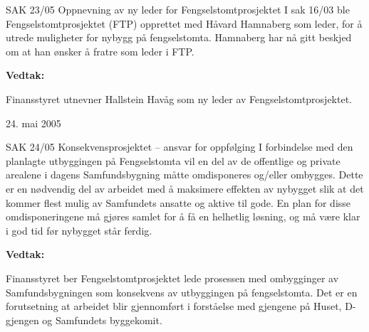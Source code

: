 \begin{instruksledd}{SAK 23/05 Oppnevning av ny leder for Fengselstomtprosjektet}
    I sak 16/03 ble Fengselstomtprosjektet (FTP) opprettet med Håvard Hamnaberg som leder,
    for å utrede muligheter for
    nybygg på fengselstomta. Hamnaberg har nå gitt beskjed om at han ønsker å fratre som
    leder i FTP.

    \textbf{Vedtak:}

    Finansstyret utnevner Hallstein Havåg som ny leder av Fengselstomtprosjektet.
    
    24. mai 2005
\end{instruksledd}


\begin{instruksledd}{SAK 24/05 Konsekvensprosjektet – ansvar for oppfølging}
    I forbindelse med den planlagte utbyggingen på Fengselstomta vil en del av de
    offentlige og private arealene i dagens
    Samfundsbygning måtte omdisponeres og/eller ombygges. Dette er en nødvendig del av
    arbeidet med å maksimere
    effekten av nybygget slik at det kommer flest mulig av Samfundets ansatte og aktive
    til gode. En plan for disse
    omdisponeringene må gjøres samlet for å få en helhetlig løsning, og må være klar i god
    tid før nybygget står ferdig.

    \textbf{Vedtak:}

    Finansstyret ber Fengselstomtprosjektet lede prosessen med ombygginger av
    Samfundsbygningen som konsekvens av
    utbyggingen på fengselstomta. Det er en forutsetning at arbeidet blir gjennomført i
    forståelse med gjengene på Huset, D-gjengen og Samfundets byggekomit.

\end{instruksledd}


